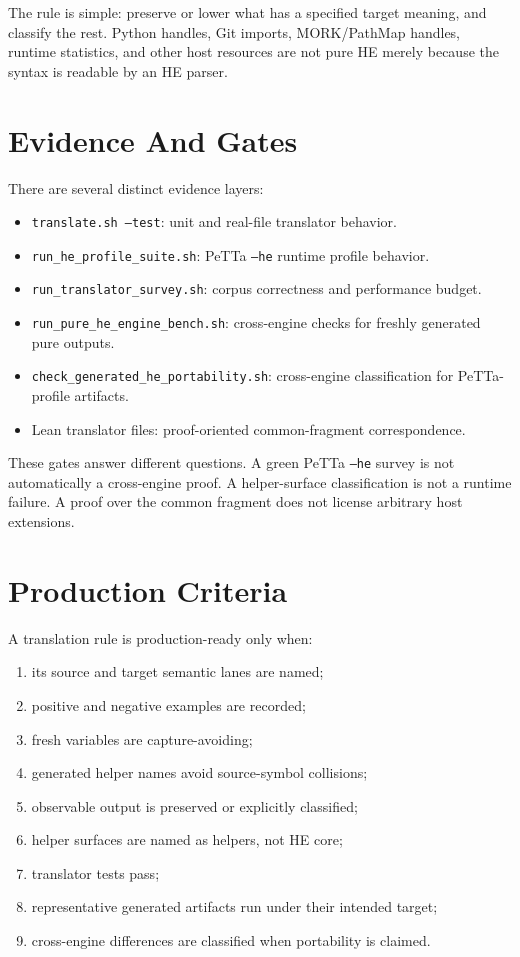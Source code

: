 \documentclass[11pt]{article}
\newcommand{\code}[1]{\texttt{#1}}
\newcommand{\HE}{\textup{HE}}
\newcommand{\PeTTa}{\textup{PeTTa}}
\begin{document}
The rule is simple: preserve or lower what has a specified target meaning, and
classify the rest.  Python handles, Git imports, MORK/PathMap handles, runtime
statistics, and other host resources are not pure \HE{} merely because the
syntax is readable by an \HE{} parser.

\section{Evidence And Gates}

There are several distinct evidence layers:

\begin{itemize}
\item \code{translate.sh --test}: unit and real-file translator behavior.
\item \code{run\_he\_profile\_suite.sh}: \PeTTa{} \code{--he} runtime profile behavior.
\item \code{run\_translator\_survey.sh}: corpus correctness and performance budget.
\item \code{run\_pure\_he\_engine\_bench.sh}: cross-engine checks for freshly generated pure outputs.
\item \code{check\_generated\_he\_portability.sh}: cross-engine classification for \PeTTa{}-profile artifacts.
\item Lean translator files: proof-oriented common-fragment correspondence.
\end{itemize}

These gates answer different questions.  A green \PeTTa{} \code{--he} survey is
not automatically a cross-engine proof.  A helper-surface classification is not
a runtime failure.  A proof over the common fragment does not license arbitrary
host extensions.

\section{Production Criteria}

A translation rule is production-ready only when:
\begin{enumerate}
\item its source and target semantic lanes are named;
\item positive and negative examples are recorded;
\item fresh variables are capture-avoiding;
\item generated helper names avoid source-symbol collisions;
\item observable output is preserved or explicitly classified;
\item helper surfaces are named as helpers, not \HE{} core;
\item translator tests pass;
\item representative generated artifacts run under their intended target;
\item cross-engine differences are classified when portability is claimed.
\end{enumerate}
\end{document}
